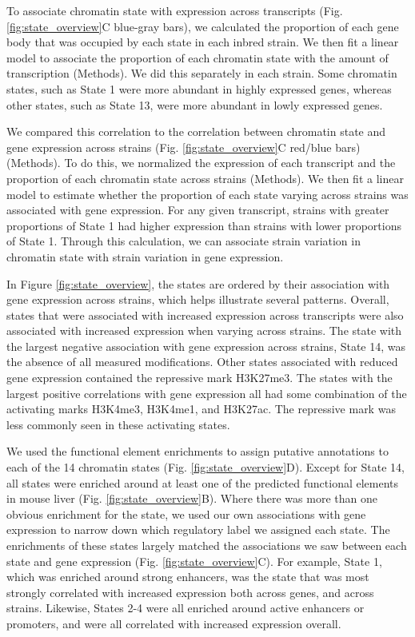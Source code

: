 \documentclass[
  11pt,
]{article}
\begin{document}
To associate chromatin state with expression across transcripts (Fig.
\ref{fig:state_overview}C blue-gray bars), we calculated the proportion
of each gene body that was occupied by each state in each inbred strain.
We then fit a linear model to associate the proportion of each chromatin
state with the amount of transcription (Methods). We did this separately
in each strain. Some chromatin states, such as State 1 were more
abundant in highly expressed genes, whereas other states, such as State
13, were more abundant in lowly expressed genes.

We compared this correlation to the correlation between chromatin state
and gene expression across strains (Fig. \ref{fig:state_overview}C
red/blue bars) (Methods). To do this, we normalized the expression of
each transcript and the proportion of each chromatin state across
strains (Methods). We then fit a linear model to estimate whether the
proportion of each state varying across strains was associated with gene
expression. For any given transcript, strains with greater proportions
of State 1 had higher expression than strains with lower proportions of
State 1. Through this calculation, we can associate strain variation in
chromatin state with strain variation in gene expression.

In Figure \ref{fig:state_overview}, the states are ordered by their
association with gene expression across strains, which helps illustrate
several patterns. Overall, states that were associated with increased
expression across transcripts were also associated with increased
expression when varying across strains. The state with the largest
negative association with gene expression across strains, State 14, was
the absence of all measured modifications. Other states associated with
reduced gene expression contained the repressive mark H3K27me3. The
states with the largest positive correlations with gene expression all
had some combination of the activating marks H3K4me3, H3K4me1, and
H3K27ac. The repressive mark was less commonly seen in these activating
states.

We used the functional element enrichments to assign putative
annotations to each of the 14 chromatin states (Fig.
\ref{fig:state_overview}D). Except for State 14, all states were
enriched around at least one of the predicted functional elements in
mouse liver (Fig. \ref{fig:state_overview}B). Where there was more than
one obvious enrichment for the state, we used our own associations with
gene expression to narrow down which regulatory label we assigned each
state. The enrichments of these states largely matched the associations
we saw between each state and gene expression (Fig.
\ref{fig:state_overview}C). For example, State 1, which was enriched
around strong enhancers, was the state that was most strongly correlated
with increased expression both across genes, and across strains.
Likewise, States 2-4 were all enriched around active enhancers or
promoters, and were all correlated with increased expression overall.
\end{document}
